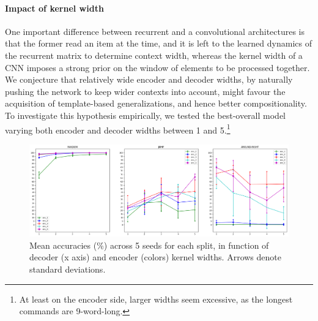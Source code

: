 

\paragraph{Impact of kernel width}
\label{subsec:exp2}

One important difference between recurrent and a convolutional
architectures is that the former read an item at the time, and it is
left to the learned dynamics of the recurrent matrix to determine
context width, whereas the kernel width of a CNN imposes a strong
prior on the window of elements to be processed together. We
conjecture that relatively wide encoder and decoder widths, by
naturally pushing the network to keep wider contexts into account,
might favour the acquisition of template-based generalizations, and
hence better compositionality. To investigate this hypothesis
empirically, we tested the best-overall model varying both encoder and
decoder widths between 1 and 5.\footnote{At least on the encoder side,
  larger widths seem excessive, as the longest commands are
  9-word-long.}


\begin{figure}[tb]
    \centering
    \includegraphics[width=\textwidth,keepaspectratio]{figures/kernel_exp.png}
    \caption{Mean accuracies (\%) across 5 seeds for each split, in function of decoder (x axis) and encoder (colors) kernel widths. Arrows denote standard deviations.
    }
    \label{fig:kernel_exp}
\end{figure}

